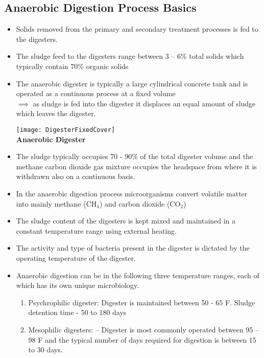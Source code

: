 \subsection{Anaerobic Digestion Process Basics}

		\begin{itemize}
		\item Solids removed from the primary and secondary treatment processes is fed to the digesters.  
		\item The sludge feed to the digesters range between 3 – 6\% total solids which typically contain 70\% organic solids
		\item The anaerobic digester is typically a large cylindrical concrete tank and is operated as a continuous process at a fixed volume\\ $\implies$ as sludge is fed into the digester it displaces an equal amount of sludge which leaves the digester.
\begin{center}
\texttt{[image: DigesterFixedCover]}\\
\textbf{Anaerobic Digester}\\
\end{center}
		\item The sludge typically occupies 70 - 90\% of the total digester volume and the methane carbon dioxide gas mixture occupies the headspace from where it is withdrawn also on a continuous basis.
		\item In the anaerobic digestion process microorganisms convert volatile matter into mainly methane (CH$_4$) and carbon dioxide (CO$_2$)
		\item The sludge content of the digesters is kept mixed and maintained in a constant temperature range using external heating.
		\item The activity and type of bacteria present in the digester is dictated by the operating temperature of the digester.
		\item Anaerobic digestion can be in the following three temperature ranges, each of which has its own unique microbiology.\\
			\begin{enumerate}[1. ]
			\item Psychrophilic digester:  Digester is maintained between 50  - 65 F.  Sludge detention time - 50 to 180 days
			\item Mesophilic digesters: – Digester is most commonly operated  between 95 – 98 F and the typical number of days required for digestion is between 15 to 30 days.\\

\end{enumerate}
\end{itemize}
